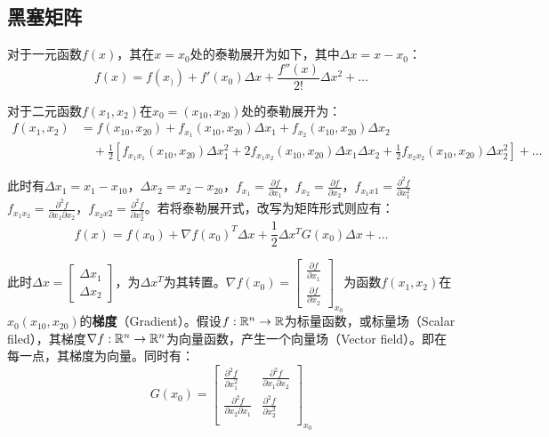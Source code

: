 \documentclass[11pt]{article}
\begin{document}
\begin{appendices}

\section{黑塞矩阵}

对于一元函数$f(x)$，其在$x=x_0$处的泰勒展开为如下，其中$\Delta x = x - x_0$：
\begin{equation*}
    f(x) = f(x_)) + f'(x_0) \Delta x + \frac{f''(x)}{2!}\Delta x^2 + \dots
\end{equation*}

对于二元函数$f(x_1,x_2)$在$x_0=(x_{10},x_{20})$处的泰勒展开为：
\begin{align*}
    f(x_1,x_2) &= f(x_{10},x_{20}) + f_{x_1}(x_{10},x_{20})\Delta x_1 + f_{x_2}(x_{10},x_{20})\Delta x_2 \\
    &\quad + \frac{1}{2} \left[ f_{x_1 x_1} (x_{10},x_{20})\Delta x_1^2 + 2 f_{x_1 x_2} (x_{10},x_{20})\Delta x_1 \Delta x_2 + \frac{1}{2} f_{x_2 x_2} (x_{10},x_{20}) \Delta x_2^2 \right] + \dots
\end{align*}

此时有$\Delta x_1 = x_1 - x_{10}$，$\Delta x_2 = x_2 - x_{20}$，$f_{x_1} = \frac{\partial f}{\partial x_1}$，$f_{x_2} = \frac{\partial f}{\partial x_2}$，$f_{x_1 x1} = \frac{\partial^2 f}{\partial x_1^2}$
$f_{x_1 x_2} = \frac{\partial^2 f}{\partial x_1 \partial x_2}$，$f_{x_2 x2} = \frac{\partial^2 f}{\partial x_2^2}$。若将泰勒展开式，改写为矩阵形式则应有：
\begin{equation*}
    f(x) = f(x_0) + \nabla f(x_0)^{T}\Delta x + \frac{1}{2}\Delta x^{T} G(x_0) \Delta x + \dots
\end{equation*}

此时$\Delta x = \begin{bmatrix} \Delta x_1\\ \Delta x_2 \end{bmatrix}$，为$\Delta x^{T}$为其转置。$\nabla f(x_0) = \begin{bmatrix} \frac{\partial f}{\partial x_1} \\ \frac{\partial f}{\partial x_2} \end{bmatrix}_{x_0}$为函数$f(x_1,x_2)$在$x_0(x_{10},x_{20})$的\textbf{梯度}（Gradient）。假设$f:\mathbb{R}^n \rightarrow \mathbb{R}$为标量函数，或标量场（Scalar filed），其梯度$\nabla f:\mathbb{R}^n \rightarrow \mathbb{R}^n$为向量函数，产生一个向量场（Vector field）。即在每一点，其梯度为向量。同时有：
\begin{equation*}
    G(x_0) =
    \begin{bmatrix}
        \frac{\partial^2 f}{\partial x_1^2} & \frac{\partial^2 f}{\partial x_1 \partial x_2} \\
        \frac{\partial^2 f}{\partial x_2 \partial x_1} & \frac{\partial^2 f}{\partial x_2^2} \\
    \end{bmatrix}_{x_0}
\end{equation*}


\end{appendices}
\end{document}
